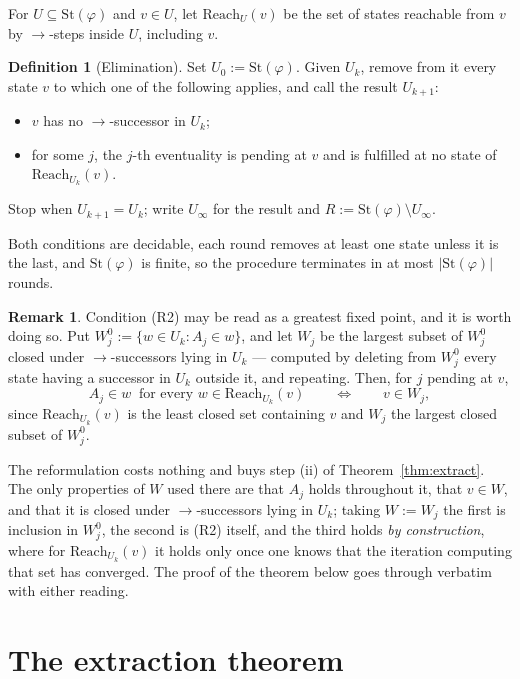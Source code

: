 \documentclass[11pt,a4paper]{article}
\theoremstyle{definition}
\newtheorem{definition}[theorem]{Definition}
\newtheorem{remark}[theorem]{Remark}
\newcommand{\St}{\mathrm{St}}
\newcommand{\Reach}{\mathrm{Reach}}
\begin{document}
For $U\subseteq\St(\varphi)$ and $v\in U$, let $\Reach_U(v)$ be the set of
states reachable from $v$ by $\to$-steps inside $U$, including $v$.

\begin{definition}[Elimination]\label{def:elim}
Set $U_0:=\St(\varphi)$.  Given $U_k$, remove from it every state $v$ to which
one of the following applies, and call the result $U_{k+1}$:
\begin{itemize}
\item[(R1)] $v$ has no $\to$-successor in $U_k$;
\item[(R2)] for some $j$, the $j$-th eventuality is pending at $v$ and is
  fulfilled at no state of $\Reach_{U_k}(v)$.
\end{itemize}
Stop when $U_{k+1}=U_k$; write $U_\infty$ for the result and
$R:=\St(\varphi)\setminus U_\infty$.
\end{definition}

Both conditions are decidable, each round removes at least one state unless it
is the last, and $\St(\varphi)$ is finite, so the procedure terminates in at
most $|\St(\varphi)|$ rounds.

\begin{remark}\label{rem:gfp}
Condition (R2) may be read as a greatest fixed point, and it is worth doing so.
Put $W_j^0:=\{w\in U_k:A_j\in w\}$, and let $W_j$ be the largest subset of
$W_j^0$ closed under $\to$-successors lying in $U_k$ --- computed by deleting
from $W_j^0$ every state having a successor in $U_k$ outside it, and repeating.
Then, for $j$ pending at $v$,
\[
  A_j\in w\ \text{ for every } w\in\Reach_{U_k}(v)
  \qquad\Longleftrightarrow\qquad
  v\in W_j ,
\]
since $\Reach_{U_k}(v)$ is the least closed set containing $v$ and $W_j$ the
largest closed subset of $W_j^0$.

The reformulation costs nothing and buys step (ii) of
Theorem~\ref{thm:extract}.  The only properties of $W$ used there are that
$A_j$ holds throughout it, that $v\in W$, and that it is closed under
$\to$-successors lying in $U_k$; taking $W:=W_j$ the first is inclusion in
$W_j^0$, the second is (R2) itself, and the third holds \emph{by construction},
where for $\Reach_{U_k}(v)$ it holds only once one knows that the iteration
computing that set has converged.  The proof of the theorem below goes through
verbatim with either reading.
\end{remark}

\section{The extraction theorem}
\end{document}
